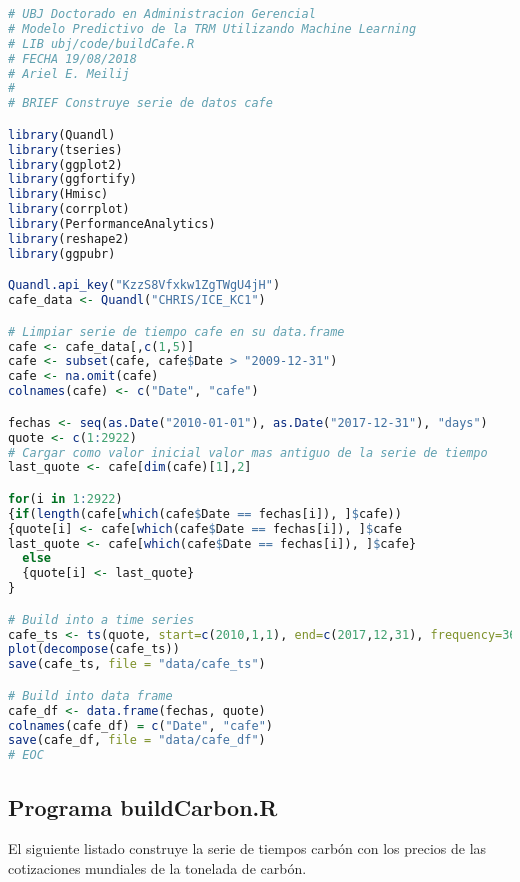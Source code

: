 \begin{lstlisting}[language=R]
# UBJ Doctorado en Administracion Gerencial
# Modelo Predictivo de la TRM Utilizando Machine Learning
# LIB ubj/code/buildCafe.R 
# FECHA 19/08/2018
# Ariel E. Meilij
#
# BRIEF Construye serie de datos cafe

library(Quandl)
library(tseries)
library(ggplot2)
library(ggfortify)
library(Hmisc)
library(corrplot)
library(PerformanceAnalytics)
library(reshape2)
library(ggpubr)

Quandl.api_key("KzzS8Vfxkw1ZgTWgU4jH")
cafe_data <- Quandl("CHRIS/ICE_KC1")

# Limpiar serie de tiempo cafe en su data.frame
cafe <- cafe_data[,c(1,5)]
cafe <- subset(cafe, cafe$Date > "2009-12-31")
cafe <- na.omit(cafe)
colnames(cafe) <- c("Date", "cafe")

fechas <- seq(as.Date("2010-01-01"), as.Date("2017-12-31"), "days")
quote <- c(1:2922)
# Cargar como valor inicial valor mas antiguo de la serie de tiempo
last_quote <- cafe[dim(cafe)[1],2]

for(i in 1:2922)
{if(length(cafe[which(cafe$Date == fechas[i]), ]$cafe))
{quote[i] <- cafe[which(cafe$Date == fechas[i]), ]$cafe
last_quote <- cafe[which(cafe$Date == fechas[i]), ]$cafe}
  else
  {quote[i] <- last_quote}
}

# Build into a time series
cafe_ts <- ts(quote, start=c(2010,1,1), end=c(2017,12,31), frequency=365)
plot(decompose(cafe_ts))
save(cafe_ts, file = "data/cafe_ts")

# Build into data frame
cafe_df <- data.frame(fechas, quote)
colnames(cafe_df) = c("Date", "cafe")
save(cafe_df, file = "data/cafe_df")
# EOC
\end{lstlisting}

\subsection{Programa buildCarbon.R}
El siguiente listado construye la serie de tiempos carbón con los precios de las cotizaciones mundiales de la tonelada de carbón.

